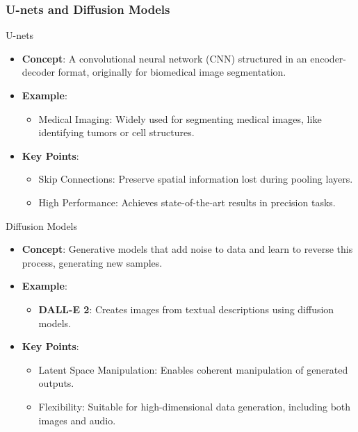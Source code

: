 \documentclass[aspectratio=169]{beamer}
\begin{document}
\begin{frame}[fragile]
  \frametitle{U-nets and Diffusion Models}
  \begin{block}{U-nets}
    \begin{itemize}
      \item \textbf{Concept}: A convolutional neural network (CNN) structured in an encoder-decoder format, originally for biomedical image segmentation.
      \item \textbf{Example}:
      \begin{itemize}
        \item Medical Imaging: Widely used for segmenting medical images, like identifying tumors or cell structures.
      \end{itemize}
      \item \textbf{Key Points}:
      \begin{itemize}
        \item Skip Connections: Preserve spatial information lost during pooling layers.
        \item High Performance: Achieves state-of-the-art results in precision tasks.
      \end{itemize}
    \end{itemize}
  \end{block}

  \begin{block}{Diffusion Models}
    \begin{itemize}
      \item \textbf{Concept}: Generative models that add noise to data and learn to reverse this process, generating new samples.
      \item \textbf{Example}:
      \begin{itemize}
        \item \textbf{DALL-E 2}: Creates images from textual descriptions using diffusion models.
      \end{itemize}
      \item \textbf{Key Points}:
      \begin{itemize}
        \item Latent Space Manipulation: Enables coherent manipulation of generated outputs.
        \item Flexibility: Suitable for high-dimensional data generation, including both images and audio.
      \end{itemize}
    \end{itemize}
  \end{block}
\end{frame}
\end{document}
